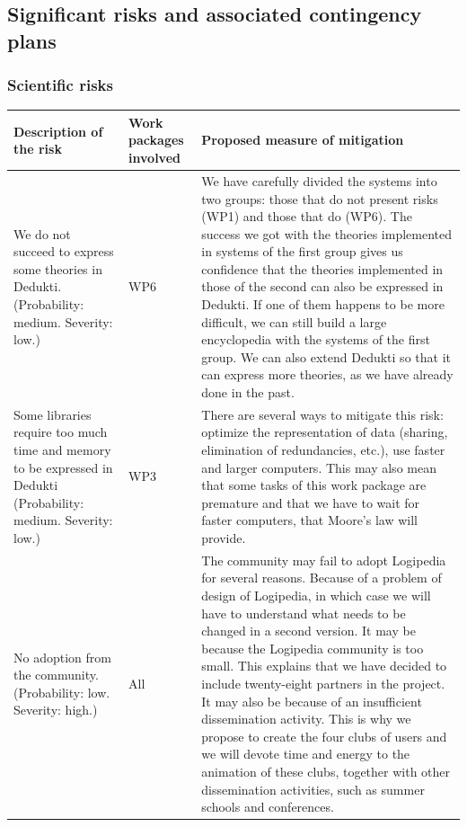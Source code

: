 \subsection*{Significant risks and associated contingency plans}
\label{sec:risks}

\subsubsection*{Scientific risks}

\begin{longtable}{|p{}|p{}|p{}|}
\hline
{\bf Description of the risk}
&
{\bf Work packages involved}
&
{\bf Proposed measure of mitigation}
\\
\hline
We do not succeed to express some theories in Dedukti.
(Probability: medium. Severity: low.)

&
WP6
&
We have carefully divided the systems into two groups: those that do not
present risks (WP1) and those that do (WP6). The success we got with the
theories implemented in systems of the first group gives us confidence
that the theories implemented in those of the second can also be
expressed in Dedukti.  If one of them happens to be more difficult, we
can still build a large encyclopedia with the systems of the first
group. We can also extend Dedukti so that it can express more theories,
as we have already done in the past.
\\
\hline
Some libraries require too much time and memory
to be expressed in Dedukti (Probability: medium. Severity: low.)
&
WP3
&
There are several ways to mitigate this risk: optimize the
representation of data (sharing, elimination of redundancies, etc.), 
use faster and larger computers. This may also mean that some tasks
of this work package are premature and that we have to wait for
faster computers, that Moore's law will provide.
\\
\hline
No adoption from the community. (Probability: low. Severity: high.)
&
All 
&
The community may fail to adopt Logipedia for several reasons. Because
of a problem of design of Logipedia, in which case we will have to
understand what needs to be changed in a second version.  It may be
because the Logipedia community is too small.  This explains that we
have decided to include twenty-eight partners in the project.  It may
also be because of an insufficient dissemination activity.  This is
why we propose to create the four clubs of users and we will devote
time and energy to the animation of these clubs, together with other
dissemination activities, such as summer schools and conferences.
\\
\hline
\end{longtable}

